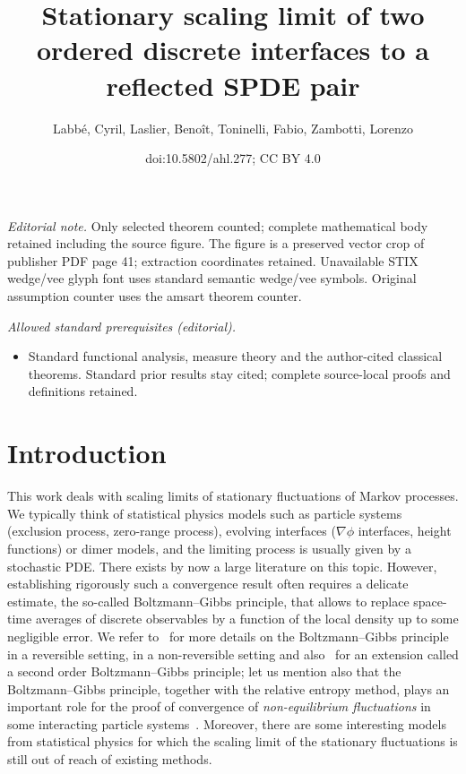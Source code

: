 \documentclass[10pt]{amsart}
\title{Stationary scaling limit of two ordered discrete interfaces to a reflected SPDE pair}
\author{Labbé, Cyril, Laslier, Benoît, Toninelli, Fabio, Zambotti, Lorenzo}
\date{doi:10.5802/ahl.277; CC BY 4.0}
\theoremstyle{definition}\newtheorem{defi}[theo]{Definition}\newtheorem{rema}[theo]{Remark}\newtheorem{exam}[theo]{Example}\newtheorem{exem}[theo]{Example}\newtheorem{nota}[theo]{Notation}
\theoremstyle{plain}
\begin{document}
\maketitle
\noindent\textit{Editorial note.} Only selected theorem counted; complete mathematical body retained including the source figure. The figure is a preserved vector crop of publisher PDF page 41; extraction coordinates retained. Unavailable STIX wedge/vee glyph font uses standard semantic wedge/vee symbols. Original assumption counter uses the amsart theorem counter.\par\medskip
\noindent\textit{Allowed standard prerequisites (editorial).}\begin{itemize}
\item Standard functional analysis, measure theory and the author-cited classical theorems. Standard prior results stay cited; complete source-local proofs and definitions retained.
\end{itemize}\medskip



\setcounter{tocdepth}{1}
\tableofcontents

\section{Introduction}

This work deals with scaling limits of stationary fluctuations of Markov processes. We typically think of statistical physics models such as particle systems (exclusion process, zero-range process), evolving interfaces ($\nabla \phi$ interfaces, height functions) or dimer models, and the limiting process is usually given by a stochastic PDE. There exists by now a large literature on this topic. However, establishing rigorously such a convergence result often requires a delicate estimate, the so-called Boltzmann--Gibbs principle, that allows to replace space-time averages of discrete observables by a function of the local density up to some negligible error. We refer to~\cite[Section~11.1]{KipLan} for more details on the Boltzmann--Gibbs principle in a reversible setting, \cite{ChangLandimOlla} in a non-reversible setting and also~\cite{GoncalvesJara} for an extension called a second order Boltzmann--Gibbs principle; let us mention also that the Boltzmann--Gibbs principle, together with the relative entropy method, plays an important role for the proof of convergence of \emph{non-equilibrium fluctuations} in some interacting particle systems~\cite{JM}. Moreover, there are some interesting models from statistical physics for which the scaling limit of the stationary fluctuations is still out of reach of existing methods.
\end{document}
